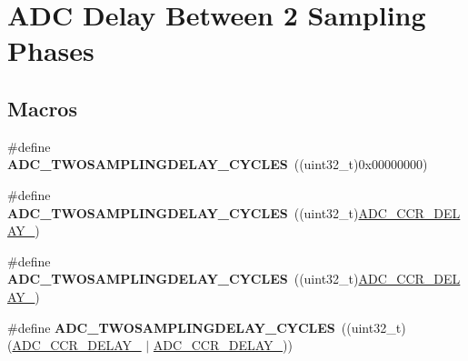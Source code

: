 \hypertarget{group___a_d_c__delay__between__2__sampling__phases}{}\section{A\+DC Delay Between 2 Sampling Phases}
\label{group___a_d_c__delay__between__2__sampling__phases}
\subsection*{Macros}
\begin{DoxyCompactItemize}
\item 
\#define {\bfseries A\+D\+C\+\_\+\+T\+W\+O\+S\+A\+M\+P\+L\+I\+N\+G\+D\+E\+L\+A\+Y\+\_\+C\+Y\+C\+L\+ES}~((uint32\+\_\+t)0x00000000)\hypertarget{group___a_d_c__delay__between__2__sampling__phases_gaf809f893a5fb22f6003d7248e484a991}{}\label{group___a_d_c__delay__between__2__sampling__phases_gaf809f893a5fb22f6003d7248e484a991}

\item 
\#define {\bfseries A\+D\+C\+\_\+\+T\+W\+O\+S\+A\+M\+P\+L\+I\+N\+G\+D\+E\+L\+A\+Y\+\_\+C\+Y\+C\+L\+ES}~((uint32\+\_\+t)\hyperlink{group___peripheral___registers___bits___definition_ga22b71e9df8b1fca93802ad602341eb0b}{A\+D\+C\+\_\+\+C\+C\+R\+\_\+\+D\+E\+L\+A\+Y\+\_})\hypertarget{group___a_d_c__delay__between__2__sampling__phases_ga3d731370a25ed30d8c1dae716d14b8bf}{}\label{group___a_d_c__delay__between__2__sampling__phases_ga3d731370a25ed30d8c1dae716d14b8bf}

\item 
\#define {\bfseries A\+D\+C\+\_\+\+T\+W\+O\+S\+A\+M\+P\+L\+I\+N\+G\+D\+E\+L\+A\+Y\+\_\+C\+Y\+C\+L\+ES}~((uint32\+\_\+t)\hyperlink{group___peripheral___registers___bits___definition_ga6d0d5785cb6c75e700517e88af188573}{A\+D\+C\+\_\+\+C\+C\+R\+\_\+\+D\+E\+L\+A\+Y\+\_})\hypertarget{group___a_d_c__delay__between__2__sampling__phases_ga630f7e758937ff7d1705ef4894227f08}{}\label{group___a_d_c__delay__between__2__sampling__phases_ga630f7e758937ff7d1705ef4894227f08}

\item 
\#define {\bfseries A\+D\+C\+\_\+\+T\+W\+O\+S\+A\+M\+P\+L\+I\+N\+G\+D\+E\+L\+A\+Y\+\_\+C\+Y\+C\+L\+ES}~((uint32\+\_\+t)(\hyperlink{group___peripheral___registers___bits___definition_ga6d0d5785cb6c75e700517e88af188573}{A\+D\+C\+\_\+\+C\+C\+R\+\_\+\+D\+E\+L\+A\+Y\+\_} $\vert$ \hyperlink{group___peripheral___registers___bits___definition_ga22b71e9df8b1fca93802ad602341eb0b}{A\+D\+C\+\_\+\+C\+C\+R\+\_\+\+D\+E\+L\+A\+Y\+\_}))\hypertarget{group___a_d_c__delay__between__2__sampling__phases_ga4a36c5233614aa76e4d911677c26067b}{}\label{group___a_d_c__delay__between__2__sampling__phases_ga4a36c5233614aa76e4d911677c26067b}


\end{DoxyCompactItemize}
